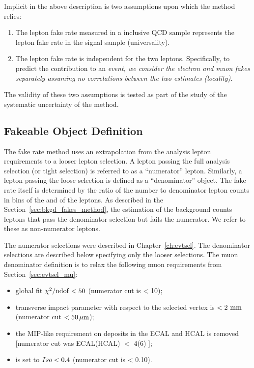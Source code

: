 Implicit in the above description is two assumptions upon which the method
relies:
\begin{enumerate}
\item The lepton fake rate measured in a inclusive QCD sample represents the
lepton fake rate in the signal sample (universality).
\item The lepton fake rate is independent for the two leptons. Specifically, to
predict the contribution to an \em event, we consider the electron and muon
fakes separately assuming no correlations between the two estimates (locality).
\end{enumerate}
The validity of these two assumptions is tested as part of the study of the
systematic uncertainty of the method.

\subsection{Fakeable Object Definition}
\label {sec:bkgd_fakes_fo}
The fake rate method uses an extrapolation from the analysis lepton
requirements to a looser lepton selection. A lepton passing the full analysis
selection (or tight selection) is referred to as a ``numerator'' lepton.
Similarly, a lepton passing the loose selection is defined as a ``denominator''
object. The fake rate itself is determined by the ratio of the number to
denominator lepton counts in bins of the \pt and \aeta of the leptons. As
described in the Section~\ref{sec:bkgd_fakes_method}, the estimation of the
background counts leptons that pass the denominator selection but fails the
numerator. We refer to these as non-numerator leptons.

The numerator selections were described in Chapter~\ref{ch:evtsel}. The
denominator selections are described below specifying only the looser
selections. The muon denominator definition is to relax the following muon
requirements from Section~\ref{sec:evtsel_mu}:
\begin{itemize}
\item global fit $\chi^{2}/\rm{ndof} < 50$ (numerator cut is < 10);
\item transverse impact parameter with respect to the selected vertex is $< 2\
\rm{mm}$ (numerator cut $< 50 \,\mu\text{m}$);
\item the MIP-like requirement on deposits in the ECAL and HCAL is removed
[numerator cut was ECAL(HCAL) $<$ 4(6) \GeV];
\item \relIso is set to $Iso < 0.4$ (numerator cut is < 0.10).
\end{itemize}

